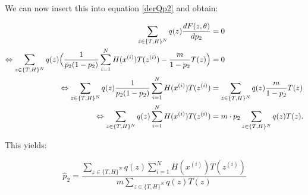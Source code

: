 \documentclass[paper=a4,fontsize=10pt,DIV11,BCOR10mm]{scrartcl}
\begin{document}
We can now insert this into equation \ref{derQp2} and obtain:

\begin{align*}
\sum_{z\in \{T,H\}^N} q(z) \frac{dF(z,\theta)}{d p_2} &=0\\
\Leftrightarrow \sum_{z\in \{T,H\}^N} q(z)\Bigl ( \frac{1}{p_2(1-p_2)}\sum_{i=1}^N  H(x^{(i)})T(z^{(i)}) -  \frac{m}{1- p_2} T(z) \Bigr) &=0\\
\Leftrightarrow  \sum_{z\in \{T,H\}^N} q(z)\frac{1}{p_2(1-p_2)}\sum_{i=1}^N  H(x^{(i)})T(z^{(i)}) &=  \sum_{z\in \{T,H\}^N} q(z) \frac{m}{1- p_2} T(z)\\
\Leftrightarrow  \sum_{z\in \{T,H\}^N} q(z)\sum_{i=1}^N  H(x^{(i)})T(z^{(i)}) &=  m \cdot p_2\sum_{z\in \{T,H\}^N} q(z) T(z).
\end{align*}

This yields:

\begin{equation*}
\hat p_2 = \frac{\sum_{z\in \{T,H\}^N} q(z)\sum_{i=1}^N  H(x^{(i)})T(z^{(i)})}{m \sum_{z\in \{T,H\}^N} q(z) T(z)}
\end{equation*}

\end{document}
